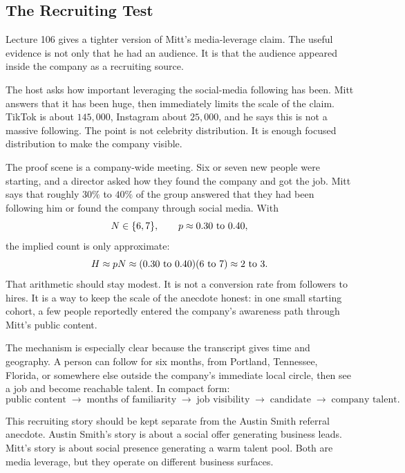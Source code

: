 \documentclass[11pt,oneside]{book}
\begin{document}
\subsection{The Recruiting Test}

Lecture 106 gives a tighter version of Mitt's media-leverage claim. The useful evidence is not only that he had an audience. It is that the audience appeared inside the company as a recruiting source.

The host asks how important leveraging the social-media following has been. Mitt answers that it has been huge, then immediately limits the scale of the claim. TikTok is about \(145{,}000\), Instagram about \(25{,}000\), and he says this is not a massive following. The point is not celebrity distribution. It is enough focused distribution to make the company visible.

The proof scene is a company-wide meeting. Six or seven new people were starting, and a director asked how they found the company and got the job. Mitt says that roughly \(30\%\) to \(40\%\) of the group answered that they had been following him or found the company through social media. With
\[
N\in\{6,7\},
\qquad
p\approx 0.30\hbox{ to }0.40,
\]
the implied count is only approximate:
\[
H\approx pN\approx (0.30\hbox{ to }0.40)(6\hbox{ to }7)\approx 2\hbox{ to }3.
\]
That arithmetic should stay modest. It is not a conversion rate from followers to hires. It is a way to keep the scale of the anecdote honest: in one small starting cohort, a few people reportedly entered the company's awareness path through Mitt's public content.

The mechanism is especially clear because the transcript gives time and geography. A person can follow for six months, from Portland, Tennessee, Florida, or somewhere else outside the company's immediate local circle, then see a job and become reachable talent. In compact form:
\[
\text{public content}
\;\longrightarrow\;
\text{months of familiarity}
\;\longrightarrow\;
\text{job visibility}
\;\longrightarrow\;
\text{candidate}
\;\longrightarrow\;
\text{company talent}.
\]

\begin{remark}
This recruiting story should be kept separate from the Austin Smith referral anecdote. Austin Smith's story is about a social offer generating business leads. Mitt's story is about social presence generating a warm talent pool. Both are media leverage, but they operate on different business surfaces.
\end{remark}
\end{document}
